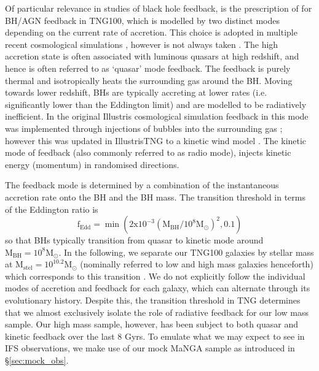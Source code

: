 Of particular relevance in studies of black hole feedback, is the prescription of \citet{weinberger17} for BH/AGN feedback in TNG100, which is modelled by two distinct modes depending on the current rate of accretion. This choice is adopted in multiple recent cosmological simulations \citep[][]{sijacki2007, dubois2014}, however is not always taken \citep[e.g.][]{schaye2015}. The high accretion state is often associated with luminous quasars at high redshift, and hence is often referred to as `quasar' mode feedback. The feedback is purely thermal and isotropically heats the surrounding gas around the BH. Moving towards lower redshift, BHs are typically accreting at lower rates (i.e. significantly lower than the Eddington limit) and are modelled to be radiatively inefficient. In the original Illustris cosmological simulation feedback in this mode was implemented through injections of bubbles into the surrounding gas \citep{sijacki2007}; however this was updated in IllustrisTNG to a kinetic wind model \citep{weinberger17}. The kinetic mode of feedback (also commonly referred to as radio mode), injects kinetic energy (momentum) in randomised directions. 

The feedback mode is determined by a combination of the instantaneous accretion rate onto the BH and the BH mass. The transition threshold in terms of the Eddington ratio is 
\begin{equation}
\mathrm{f_{Edd}= \min ( 2x10^{-3}(M_{BH}/10^8 M_{\odot})^2 , 0.1)}
\end{equation}
so that BHs typically transition from quasar to kinetic mode around $\mathrm{M_{BH} = 10^{8}M_{\odot}}$. In the following, we separate our TNG100 galaxies by stellar mass at $\mathrm{M_{stel} = 10^{10.2}M_{\odot}}$ (nominally referred to low and high mass galaxies henceforth) which corresponds to this transition \citep[i.e. $\mathrm{M_{BH} \approx 10^{8}M_{\odot}}$, see Fig 1 in][]{li2019}. We do not explicitly follow the individual modes of accretion and feedback for each galaxy, which can alternate through its evolutionary history. Despite this, the transition threshold in TNG determines that we almost exclusively isolate the role of radiative feedback for our low mass sample. Our high mass sample, however, has been subject to both quasar and kinetic feedback over the last 8 Gyrs. To emulate what we may expect to see in IFS observations, we make use of our mock MaNGA sample as introduced in \S\ref{sec:mock_obs}.

